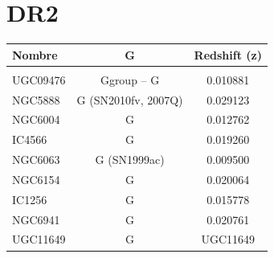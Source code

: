 \documentclass[9pt]{revtex4-1}
\begin{document}
\section{DR2}

\begin{center}

\begin{tabular}{ l c c }

Nombre & G & Redshift (z) \\
\hline
\hline \\
UGC09476 & Ggroup -- G & 0.010881 \\
NGC5888  & G (SN2010fv, 2007Q) & 0.029123 \\
NGC6004  & G & 0.012762 \\
IC4566   & G & 0.019260 \\
NGC6063  & G (SN1999ac) & 0.009500 \\
NGC6154  & G & 0.020064 \\
IC1256   & G & 0.015778 \\
NGC6941  & G & 0.020761 \\
UGC11649 & G & UGC11649 \\

\end{tabular}

\end{center}
\end{document}
